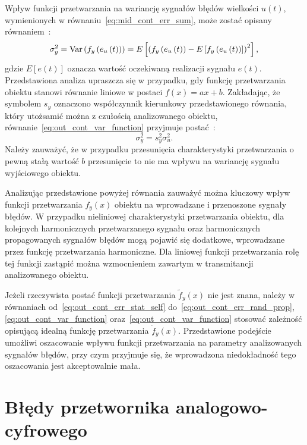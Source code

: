 Wpływ funkcji przetwarzania na wariancję sygnałów błędów wielkości $u(t)$, wymienionych w równaniu~\eqref{eq:mid_cont_err_sum}, może zostać opisany równaniem~\cite{oppenheim_sns}:
\begin{equation}
\sigma_{y}^{2} = \text{Var}\left(f_{y} \left(e_{u} \left(t\right)\right)\right) = E \left[ \left( f_{y} \left(e_{u} \left(t\right)\right) - E \left[ f_{y} \left(e_{u} \left(t\right)\right) \right] \right)^2 \right] \label{eq:out_cont_var_function},
\end{equation}
gdzie $E[e(t)]$ oznacza wartość oczekiwaną realizacji sygnału $e(t)$. Przedstawiona analiza upraszcza się w przypadku, gdy funkcję przetwarzania obiektu stanowi równanie liniowe w postaci $f(x) = ax+b$. Zakładając, że symbolem $s_{y}$ oznaczono współczynnik kierunkowy przedstawionego równania, który utożsamić można z czułością analizowanego obiektu, równanie~\eqref{eq:out_cont_var_function} przyjmuje postać~\cite{oppenheim_sns}:
\begin{equation}
\sigma_{y}^{2} = s_{y}^{2} \sigma_{u}^{2} \label{eq:out_cont_var_sense}.
\end{equation}
Należy zauważyć, że w przypadku przesunięcia charakterystyki przetwarzania o pewną stałą wartość $b$ przesunięcie to nie ma wpływu na wariancję sygnału wyjściowego obiektu.

Analizując przedstawione powyżej równania zauważyć można kluczowy wpływ funkcji przetwarzania $f_{y}(x)$ obiektu na wprowadzane i przenoszone sygnały błędów. W przypadku nieliniowej charakterystyki przetwarzania obiektu, dla kolejnych harmonicznych przetwarzanego sygnału oraz harmonicznych propagowanych sygnałów błędów mogą pojawić się dodatkowe, wprowadzane przez funkcję przetwarzania harmoniczne. Dla liniowej funkcji przetwarzania rolę tej funkcji zastąpić można wzmocnieniem zawartym w transmitancji analizowanego obiektu.

Jeżeli rzeczywista postać funkcji przetwarzania $\tilde{f}_{y}(x)$ nie jest znana, należy w równaniach od~\eqref{eq:out_cont_err_stat_self} do~\eqref{eq:out_cont_err_rand_prop}, \eqref{eq:out_cont_var_function} oraz~\eqref{eq:out_cont_var_function} stosować zależność opisującą idealną funkcję przetwarzania $\dot{f}_{y}(x)$. Przedstawione podejście umożliwi oszacowanie wpływu funkcji przetwarzania na parametry analizowanych sygnałów błędów, przy czym przyjmuje się, że wprowadzona niedokładność tego oszacowania jest akceptowalnie mała.

\section{Błędy przetwornika analogowo-cyfrowego}

